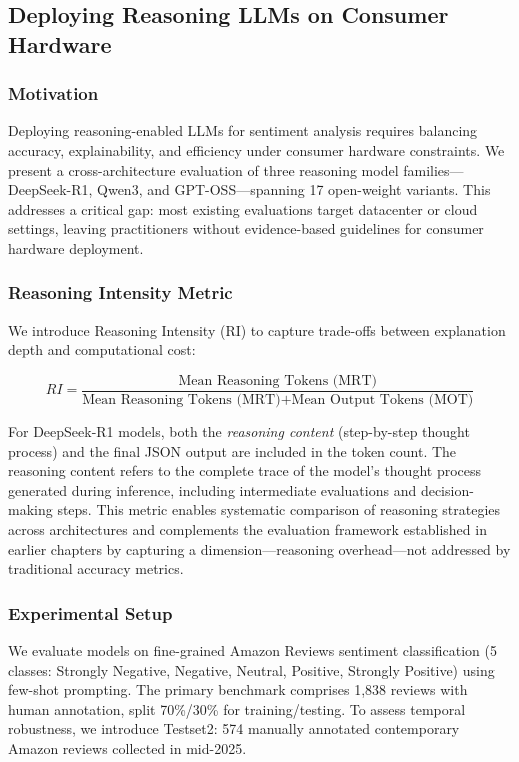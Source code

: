 \subsection{Deploying Reasoning LLMs on Consumer Hardware}
\label{subsec:reasoning_deployment}

\subsubsection{Motivation}

Deploying reasoning-enabled LLMs for sentiment analysis requires balancing accuracy, explainability, and efficiency under consumer hardware constraints. We present a cross-architecture evaluation of three reasoning model families---DeepSeek-R1, Qwen3, and GPT-OSS---spanning 17 open-weight variants. This addresses a critical gap: most existing evaluations target datacenter or cloud settings, leaving practitioners without evidence-based guidelines for consumer hardware deployment.

\subsubsection{Reasoning Intensity Metric}

We introduce Reasoning Intensity (RI) to capture trade-offs between explanation depth and computational cost:

\begin{equation}
RI = \frac{\text{Mean Reasoning Tokens (MRT)}}{\text{Mean Reasoning Tokens (MRT)} + \text{Mean Output Tokens (MOT)}}
\end{equation}

For DeepSeek-R1 models, both the \textit{reasoning content} (step-by-step thought process) and the final JSON output are included in the token count. The reasoning content refers to the complete trace of the model's thought process generated during inference, including intermediate evaluations and decision-making steps. This metric enables systematic comparison of reasoning strategies across architectures and complements the evaluation framework established in earlier chapters by capturing a dimension---reasoning overhead---not addressed by traditional accuracy metrics.

\subsubsection{Experimental Setup}

We evaluate models on fine-grained Amazon Reviews sentiment classification (5 classes: Strongly Negative, Negative, Neutral, Positive, Strongly Positive) using few-shot prompting. The primary benchmark comprises 1,838 reviews with human annotation, split 70\%/30\% for training/testing. To assess temporal robustness, we introduce Testset2: 574 manually annotated contemporary Amazon reviews collected in mid-2025.

